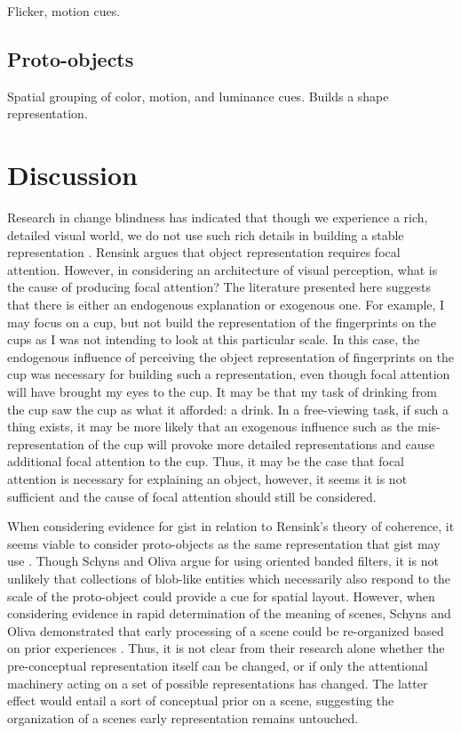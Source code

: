 \documentclass[a4paper,10pt,final]{ThesisStyle}
\begin{document}
Flicker, motion cues.

\subsection{Proto-objects}

Spatial grouping of color, motion, and luminance cues.  Builds a shape representation.

\section{Discussion}

Research in change blindness has indicated that though we experience a rich, detailed visual world, we do not use such rich details in building a stable representation \cite{Simons1997}.  Rensink argues that object representation requires focal attention.  However, in considering an architecture of visual perception, what is the cause of producing focal attention?  The literature presented here suggests that there is either an endogenous explanation or exogenous one.  For example, I may focus on a cup, but not build the representation of the fingerprints on the cups as I was not intending to look at this particular scale.  In this case, the endogenous influence of perceiving the object representation of fingerprints on the cup was necessary for building such a representation, even though focal attention will have brought my eyes to the cup.  It may be that my task of drinking from the cup saw the cup as what it afforded: a drink.  In a free-viewing task, if such a thing exists, it may be more likely that an exogenous influence such as the mis-representation of the cup will provoke more detailed representations and cause additional focal attention to the cup.  Thus, it may be the case that focal attention is necessary for explaining an object, however, it seems it is not sufficient and the cause of focal attention should still be considered.  

When considering evidence for gist in relation to Rensink's theory of coherence, it seems viable to consider proto-objects as the same representation that gist may use \cite{Rensink2002}.  Though Schyns and Oliva argue for using oriented banded filters, it is not unlikely that collections of blob-like entities which necessarily also respond to the scale of the proto-object could provide a cue for spatial layout.   However, when considering evidence in rapid determination of the meaning of scenes, Schyns and Oliva demonstrated that early processing of a scene could be re-organized based on prior experiences \cite{Schyns1994,Oliva1997}.  Thus, it is not clear from their research alone whether the pre-conceptual representation itself can be changed, or if only the attentional machinery acting on a set of possible representations has changed.  The latter effect would entail a sort of conceptual prior on a scene, suggesting the organization of a scenes early representation remains untouched.
\end{document}
